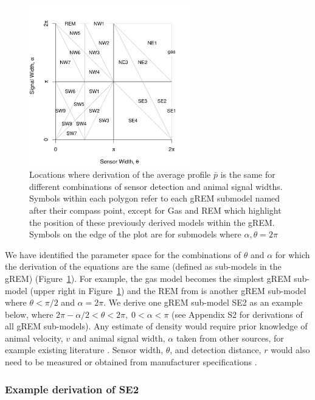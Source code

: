 \begin{figure}
\centering
\includegraphics[width=7cm]{imgs/lucas_et_al_figure2.pdf}
\caption[Locations where derivation of the average profile $\bar{p}$ is the same]{
Locations where derivation of the average profile $\bar{p}$ is the same for different combinations of sensor detection and animal signal widths.
Symbols within each polygon refer to each gREM submodel named after their compass point, except for Gas and REM which highlight the position of these previously derived models within the gREM.
Symbols on the edge of the plot are for submodels where $\alpha, \theta = 2\pi$}
\label{f:equalRegions}
\end{figure}

We have identified the parameter space for the combinations of $\theta$ and $\alpha$ for which the derivation of the equations are the same (defined as sub-models in the gREM) (Figure~\ref{f:equalRegions}).
For example, the gas model becomes the simplest gREM sub-model (upper right in Figure~\ref{f:equalRegions}) and the REM from \cite{rowcliffe2008estimating} is another gREM sub-model where $\theta<\pi/2$ and $\alpha = 2\pi$.
We derive one gREM sub-model SE2 as an example below, where $2 \pi - \alpha/2 < \theta < 2\pi ,\; 0 < \alpha <\pi$ (see Appendix S2 for derivations of all gREM sub-models).
Any estimate of density would require prior knowledge of animal velocity, $v$ and animal signal width, $\alpha$ taken from other sources, for example existing literature \cite{brinklov2011, carbone2005far}.
Sensor width, $\theta$, and detection distance, $r$ would also need to be measured or obtained from manufacturer specifications \cite{holderied2003echolocation, adams2012you}.


\subsubsection{Example derivation of SE2}

